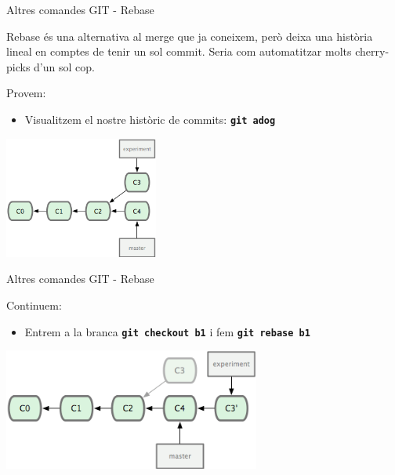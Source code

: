 \documentclass[10pt,xcolor={rgb}]{beamer}
\begin{document}
    \begin{frame}[fragile]{Altres comandes GIT - Rebase}

      Rebase és una alternativa al merge que ja coneixem, però deixa una història lineal en comptes de tenir un sol commit.  Seria com automatitzar molts cherry-picks d'un sol cop.
      \begin{block}{Provem:}
      \begin{itemize}
        \item Visualitzem el nostre històric de commits: \texttt{\textbf{git adog}}
      \end{itemize}

      \centering
      \includegraphics[height=4cm]{rebase1.png}

      \end{block}
    \end{frame}

    \begin{frame}[fragile]{Altres comandes GIT - Rebase}

      \begin{block}{Continuem:}
      \begin{itemize}
        \item Entrem a la branca \texttt{\textbf{git checkout b1}} i fem \texttt{\textbf{git rebase b1}}
      \end{itemize}

      \centering
      \includegraphics[height=4cm]{rebase2.png}

      \end{block}
    \end{frame}
\end{document}
